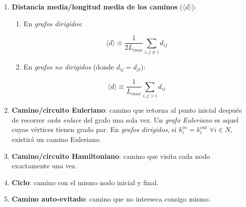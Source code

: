 \documentclass[10pt,spanish, landscape, twocolumn]{article}
\begin{document}
\begin{enumerate}[\color{temados}{$\triangleright$}]
    \item \textbf{\textcolor{temados}{Distancia media/longitud media de los caminos}} ($\langle d \rangle$):
    \begin{enumerate}[---]
        \item En \textit{\textcolor{temados}{grafos dirigidos}}:

        \begin{displaymath}
            \langle d \rangle \equiv \frac{1}{2 L_{max}} \sum_{i, j \neq i} d_{ij}
        \end{displaymath}

        \item En \textit{\textcolor{temados}{grafos no dirigidos}} (donde $d_{ij} = d_{ji}$):

        \begin{displaymath}
            \langle d \rangle \equiv \frac{1}{L_{max}} \sum_{i, j > i} d_{ij}
        \end{displaymath}
    \end{enumerate}

    \item \textbf{\textcolor{temados}{Camino/circuito Euleriano}}: camino que retorna al punto inicial después de recorrer \textit{\textcolor{temados}{cada enlace}} del grafo una sola vez. Un \textit{\textcolor{temados}{grafo Euleriano}} es aquel cuyos vértices tienen grado par. En \textit{\textcolor{temados}{grafos dirigidos}}, si $k_{i}^{in} = k_{i}^{out} \; \forall i \in N$, existirá un camino Euleriano.

    \item \textbf{\textcolor{temados}{Camino/circuito Hamiltoniano}}: camino que visita cada nodo exactamente una vez.

    \item \textbf{\textcolor{temados}{Ciclo}}: camino con el mismo nodo inicial y final.

    \item \textbf{\textcolor{temados}{Camino auto-evitado}}: camino que no interseca consigo mismo.
\end{enumerate}
\end{document}
